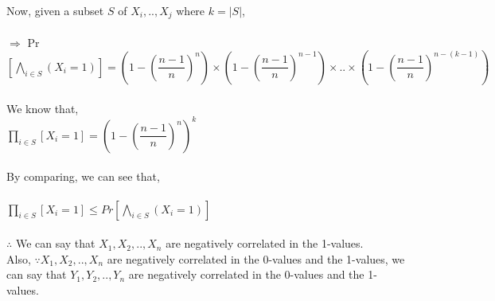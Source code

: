 \documentclass{article}
\begin{document}
\\
Now, given a subset $S$ of $X_{i}, .., X_{j}$ where $k = |S|$, \\
\\$\Rightarrow$ Pr$\left[\bigwedge\limits_{i \in S}(X_{i} = 1)\right] = \left(1-\left(\dfrac{n-1}{n}\right)^n\right) \times 
\left(1-\left(\dfrac{n-1}{n}\right)^{n-1}\right) \times .. \times \left(1-\left(\dfrac{n-1}{n}\right)^{n-(k-1)}\right) 
$\\
\\
We know that, \\
$\prod\limits_{i \in S}\left[X_{i} = 1\right] = \left(1-\left(\dfrac{n-1}{n}\right)^n\right)^{k} $\\
\\
By comparing, we can see that,\\
\\
$\prod\limits_{i \in S}\left[X_{i} = 1\right] \le Pr\left[\bigwedge\limits_{i \in S}(X_{i} = 1)\right]$ \\
\\
$\therefore $ We can say that $X_{1}, X_{2}, .., X_{n}$ are negatively correlated in the 1-values.
\\
Also, $\because X_{1}, X_{2}, .., X_{n}$ are negatively correlated in the 0-values and the 1-values, 
we can say that $Y_{1}, Y_{2}, .., Y_{n}$ are negatively correlated in the 0-values and the 1-values.
\end{document}
